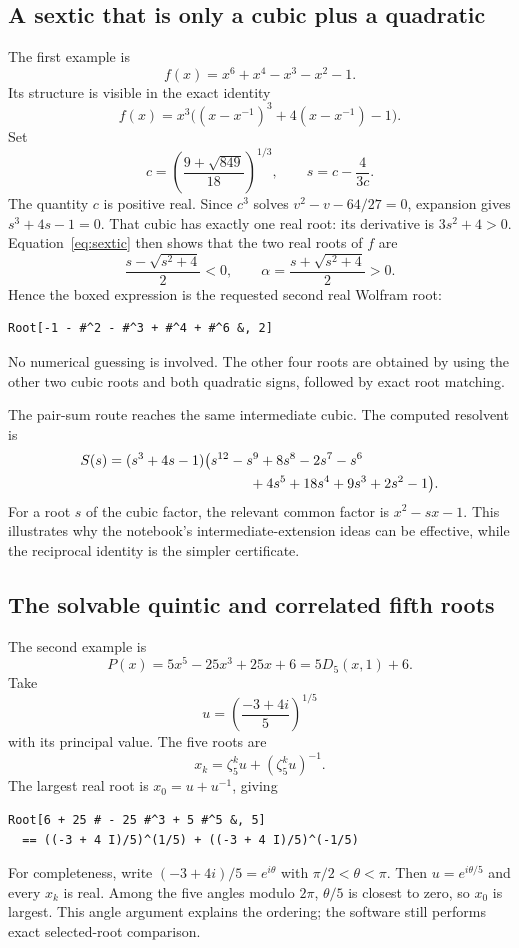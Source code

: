 \documentclass[11pt,a4paper]{article}
\theoremstyle{definition}\newtheorem{definition}[theorem]{Definition}
\theoremstyle{remark}\newtheorem{remark}[theorem]{Remark}
\begin{document}
\subsection{A sextic that is only a cubic plus a quadratic}
The first example is
\[
 f(x)=x^6+x^4-x^3-x^2-1.
\]
Its structure is visible in the exact identity
\begin{equation}\label{eq:sextic}
 f(x)=x^3\bigl((x-x^{-1})^3+4(x-x^{-1})-1\bigr).
\end{equation}
Set
\[
 c=\left(\frac{9+\sqrt{849}}{18}\right)^{1/3},\qquad
 s=c-\frac{4}{3c}.
\]
The quantity $c$ is positive real. Since $c^3$ solves
$v^2-v-64/27=0$, expansion gives $s^3+4s-1=0$. That cubic has exactly one
real root: its derivative is $3s^2+4>0$. Equation~\eqref{eq:sextic} then
shows that the two real roots of $f$ are
\[
 \frac{s-\sqrt{s^2+4}}2<0,
 \qquad
 \boxed{\alpha=\frac{s+\sqrt{s^2+4}}2>0}.
\]
Hence the boxed expression is the requested second real Wolfram root:
\begin{lstlisting}
Root[-1 - #^2 - #^3 + #^4 + #^6 &, 2]
\end{lstlisting}
No numerical guessing is involved. The other four roots are obtained by
using the other two cubic roots and both quadratic signs, followed by exact
root matching.

The pair-sum route reaches the same intermediate cubic. The computed
resolvent is
\begin{align*}
 S(s)={}&(s^3+4s-1)\bigl(s^{12}-s^9+8s^8-2s^7-s^6\\
       &\hspace{31mm}+4s^5+18s^4+9s^3+2s^2-1\bigr).
\end{align*}
For a root $s$ of the cubic factor, the relevant common factor is
$x^2-sx-1$. This illustrates why the notebook's intermediate-extension ideas
can be effective, while the reciprocal identity is the simpler certificate.

\subsection{The solvable quintic and correlated fifth roots}
The second example is
\[
 P(x)=5x^5-25x^3+25x+6=5D_5(x,1)+6.
\]
Take
\[
 u=\left(\frac{-3+4i}{5}\right)^{1/5}
\]
with its principal value. The five roots are
\[
 x_k=\zeta_5^k u+(\zeta_5^k u)^{-1}.
\]
The largest real root is $x_0=u+u^{-1}$, giving
\begin{lstlisting}
Root[6 + 25 # - 25 #^3 + 5 #^5 &, 5]
  == ((-3 + 4 I)/5)^(1/5) + ((-3 + 4 I)/5)^(-1/5)
\end{lstlisting}
For completeness, write $(-3+4i)/5=e^{i\theta}$ with
$\pi/2<\theta<\pi$. Then $u=e^{i\theta/5}$ and every $x_k$ is real.
Among the five angles modulo $2\pi$, $\theta/5$ is closest to zero, so
$x_0$ is largest. This angle argument explains the ordering; the software
still performs exact selected-root comparison.
\end{document}
